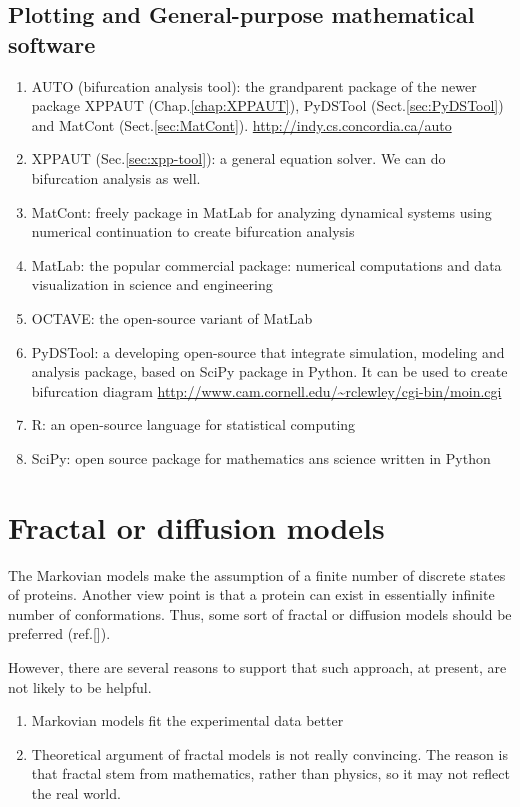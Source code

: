 \subsection{Plotting and General-purpose mathematical software}

\begin{enumerate}
  \item AUTO (bifurcation analysis tool): the grandparent package of the newer
  package XPPAUT (Chap.\ref{chap:XPPAUT}), PyDSTool (Sect.\ref{sec:PyDSTool})
  and MatCont (Sect.\ref{sec:MatCont}).
  \url{http://indy.cs.concordia.ca/auto}

  \item XPPAUT (Sec.\ref{sec:xpp-tool}): a general equation solver. We can do
  bifurcation analysis as well.

  \item MatCont: freely package in MatLab for analyzing dynamical systems using
  numerical continuation to create bifurcation analysis

  \item MatLab: the popular commercial package: numerical computations and data
  visualization in science and engineering
  \item OCTAVE: the open-source variant of MatLab
  \item PyDSTool: a developing open-source that integrate simulation, modeling
  and analysis package, based on SciPy package in Python. It can be used to
  create bifurcation diagram
  \url{http://www.cam.cornell.edu/~rclewley/cgi-bin/moin.cgi}
  \item R: an open-source language for statistical computing
  \item SciPy: open source package for mathematics ans science written in Python
\end{enumerate}

\section{Fractal or diffusion models}
\label{sec:fractal-models}

The Markovian models make the assumption of a finite number of
discrete states of proteins. Another view point is that a protein can
exist in essentially infinite number of conformations. Thus, some sort
of fractal or diffusion models should be preferred (ref.[]).

However, there are several reasons to support that such approach, at
present, are not likely to be helpful.
\begin{enumerate}
\item Markovian models fit the experimental data better
\item Theoretical argument of fractal models is not really
  convincing. The reason is that fractal stem from mathematics, rather
  than physics, so it may not reflect the real world.
\end{enumerate}


